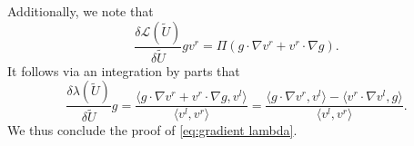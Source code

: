 \documentclass[11pt,a4paper]{article}
\numberwithin{equation}{section}
\begin{document}
Additionally, we note that
\[ \frac{\delta \mathcal{L} (\widetilde{U})}{\delta \widetilde{U}} g v^r = \Pi (g
   \cdot \nabla v^r + v^r \cdot \nabla g) . \]
It follows via an integration by parts that
\[ \frac{\delta \lambda (\widetilde{U})}{\delta \widetilde{U}} g = \frac{\langle g
   \cdot \nabla v^r + v^r \cdot \nabla g, v^l \rangle}{\langle v^l, v^r
   \rangle} = \frac{\langle g \cdot \nabla v^r, v^l \rangle - \langle v^r
   \cdot \nabla v^l, g \rangle}{\langle v^l, v^r \rangle} . \]
   We thus conclude the proof of \eqref{eq:gradient lambda}.
\end{document}
